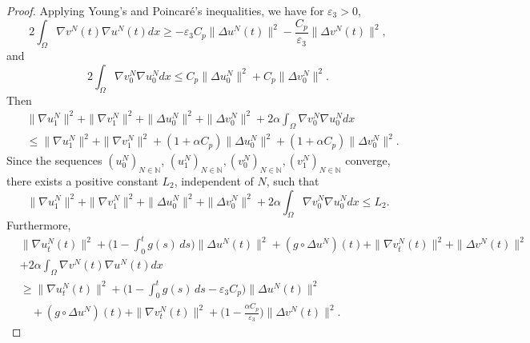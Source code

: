 \documentclass[reqno]{amsart}
\begin{document}
\begin{proof}
Applying Young's and Poincar\'e's inequalities, we have for $\varepsilon_{3}> 0$,
 \begin{equation*}
 2\int_{\Omega} \nabla v^N(t) \nabla u^N(t) dx
 \geq - \varepsilon_{3} C_p\| \Delta u^N(t) \|^2 - \frac{C_p}{\varepsilon_{3}}\| \Delta v^N(t) \|^2,
 \end{equation*}
and
\[
 2 \int_{\Omega} \nabla v^N_0 \nabla u^N_0 dx
 \leq C_p\| \Delta u^N_0 \|^2 +C_p \| \Delta v^N_0 \|^2.
\]
Then
\begin{equation}
\begin{aligned}
& \| \nabla u^N_{1} \|^2+ \| \nabla v^N_{1} \|^2+\| \Delta u^N_0 \|^2
 + \| \Delta v^N_0 \|^2 +2 \alpha \int_{\Omega} \nabla v^N_0 \nabla u^N_0 dx \\
&\leq \| \nabla u^N_{1} \|^2+ \| \nabla v^N_{1} \|^2
 +(1+\alpha C_p) \| \Delta u^N_0 \|^2
 +(1+\alpha C_p)\| \Delta v^N_0 \|^2.
\end{aligned} \label{e3.16}
\end{equation}
Since the sequences $ (u_0^N)_{N \in \mathbb{N}}$,
$ (u_1^N)_{N \in \mathbb{N}}, (v_0^N)_{N \in \mathbb{N}}, (v_1^N)_{N \in \mathbb{N}} $
converge, there exists a positive constant $L_2$, independent of $N$, such that
\begin{equation}
 \| \nabla u^N_{1} \|^2+ \| \nabla v^N_{1} \|^2
 +\| \Delta u^N_0 \|^2 + \| \Delta v^N_0 \|^2
 +2 \alpha \int_{\Omega} \nabla v^N_0 \nabla u^N_0 dx\leq L_2. \label{e3.17}
\end{equation}
Furthermore,
\begin{align*}
&\| \nabla u^N_{t}(t) \|^2+\Big( 1 - \int_0^t g(s)\,ds \Big) \| \Delta u^N(t) \|^2
 + (g \circ \Delta u^N)(t) + \| \nabla v^N_{t}(t) \|^2+ \| \Delta v^N (t)\|^2 \\
&+2 \alpha \int_{\Omega} \nabla v^N (t)\nabla u^N(t) dx \\
&\geq \| \nabla u^N_{t}(t) \|^2+\Big( 1 - \int_0^t g(s)\,ds
 - \varepsilon_{3} C_p \Big) \| \Delta u^N(t) \|^2 \\
&\quad + (g \circ \Delta u^N)(t) + \| \nabla v^N_{t}(t) \|^2
 +\Big( 1-\frac{\alpha C_p}{\varepsilon_{3}}\Big) \| \Delta v^N(t) \|^2.
\end{align*}


\end{proof}
\end{document}
